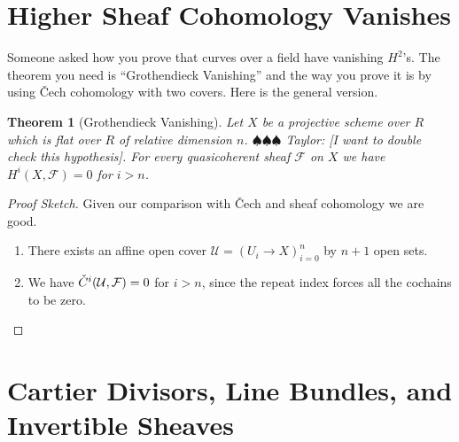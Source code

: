 \documentclass[12pt]{article}
\numberwithin{equation}{section}
\newtheorem{theorem}{Theorem}[subsection]
\theoremstyle{definition}
\theoremstyle{remark}
\newcommand{\Fcal}{\mathcal{F}}
\newcommand{\Ucal}{\mathcal{U}}
\newcommand{\Cv}{\Check{C}}
\newcommand{\taylor}[1]{{\color{blue} \sf $\spadesuit\spadesuit\spadesuit$ Taylor: [#1]}}
\begin{document}

\section{Higher Sheaf Cohomology Vanishes}

Someone asked how you prove that curves over a field have vanishing $H^2$'s. 
The theorem you need is ``Grothendieck Vanishing'' and the way you prove it is by using \v{C}ech cohomology with two covers. 
Here is the general version. 
\begin{theorem}[Grothendieck Vanishing]
	Let $X$ be a projective scheme over $R$ which is flat over $R$ of relative dimension $n$. \taylor{I want to double check this hypothesis}. For every quasicoherent sheaf $\Fcal$ on $X$ we have $H^i(X,\Fcal)=0$ for $i>n$.
\end{theorem}
\begin{proof}[Proof Sketch]
	Given our comparison with \v{C}ech and sheaf cohomology we are good.
	\begin{enumerate}
		\item There exists an affine open cover $\Ucal = (U_i \to X)_{i=0}^n$ by $n+1$ open sets. 
		\item We have $\Cv^i(\Ucal,\Fcal)=0$ for $i>n$, since the repeat index forces all the cochains to be zero. 
	\end{enumerate}
\end{proof}

\section{Cartier Divisors, Line Bundles, and Invertible Sheaves}
\end{document}
